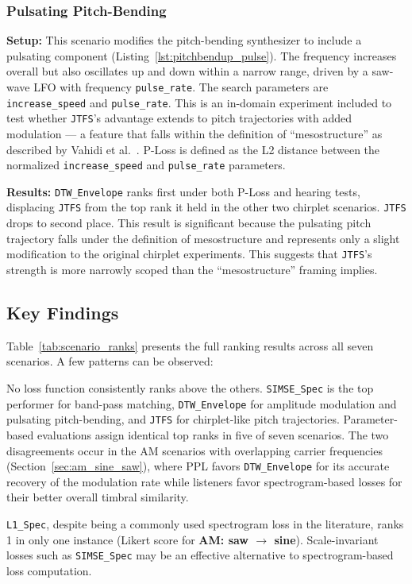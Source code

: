 \documentclass{article}
\newcommand{\SIMSESpec}{\texttt{SIMSE\_\allowbreak Spec}\xspace}
\newcommand{\LoneSpec}{\texttt{L1\_\allowbreak Spec}\xspace}
\newcommand{\JTFS}{\texttt{JTFS}\xspace}
\newcommand{\DTWEnv}{\texttt{DTW\_\allowbreak Envelope}\xspace}
\begin{document}
\subsubsection{Pulsating Pitch-Bending}
\label{sec:pulsating_chirplet}
\textbf{Setup:} This scenario modifies the pitch-bending synthesizer to include a pulsating component (Listing~\ref{lst:pitchbendup_pulse}). The frequency increases overall but also oscillates up and down within a narrow range, driven by a saw-wave LFO with frequency \texttt{pulse\_rate}. The search parameters are \texttt{increase\_speed} and \texttt{pulse\_rate}. This is an in-domain experiment included to test whether \JTFS's advantage extends to pitch trajectories with added modulation --- a feature that falls within the definition of ``mesostructure'' as described by Vahidi et al.~\cite{vahidi2023mesostructures}. P-Loss is defined as the L2 distance between the normalized \texttt{increase\_speed} and \texttt{pulse\_rate} parameters.

\noindent \textbf{Results:} \DTWEnv ranks first under both P-Loss and hearing tests, displacing \JTFS from the top rank it held in the other two chirplet scenarios. \JTFS drops to second place. This result is significant because the pulsating pitch trajectory falls under the definition of mesostructure and represents only a slight modification to the original chirplet experiments. This suggests that \JTFS's strength is more narrowly scoped than the ``mesostructure'' framing implies.


\subsection{Key Findings}
\label{sec:summary_of_results}
Table~\ref{tab:scenario_ranks} presents the full ranking results across all seven scenarios. A few patterns can be observed:

No loss function consistently ranks above the others. \SIMSESpec{} is the top performer for band-pass matching, \DTWEnv{} for amplitude modulation and pulsating pitch-bending, and \JTFS{} for chirplet-like pitch trajectories. Parameter-based evaluations assign identical top ranks in five of seven scenarios. The two disagreements occur in the AM scenarios with overlapping carrier frequencies (Section~\ref{sec:am_sine_saw}), where PPL favors \DTWEnv{} for its accurate recovery of the modulation rate while listeners favor spectrogram-based losses for their better overall timbral similarity.

\LoneSpec{}, despite being a commonly used spectrogram loss in the literature, ranks 1 in only one instance (Likert score for \textbf{AM: saw $\rightarrow$ sine}). Scale-invariant losses such as \SIMSESpec{} may be an effective alternative to spectrogram-based loss computation.
\end{document}
